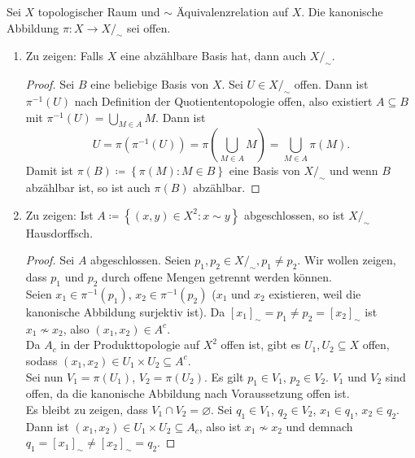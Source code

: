 \begin{problem}[4]
  Sei \( X \) topologischer Raum und \( \sim \) Äquivalenzrelation auf \( X \). Die kanonische Abbildung \( \pi : X \to X/_\sim \) sei offen.
  \begin{enumerate}
    \item Zu zeigen: Falls \( X \) eine abzählbare Basis hat, dann auch \( X/_\sim \).
    \begin{proof}
      Sei \( B \) eine beliebige Basis von \( X \). Sei \( U \in X/_\sim \) offen. Dann ist \( \pi^{-1}(U) \) nach Definition der Quotiententopologie offen, also existiert \( A \subseteq B \) mit \( \pi^{-1}(U) = \bigcup_{M \in A}M \). Dann ist
      \begin{equation*}
        U = \pi(\pi^{-1}(U)) = \pi\left(\bigcup_{M \in A} M \right) = \bigcup_{M \in A} \pi(M)\text{.}
      \end{equation*}
      Damit ist \( \pi(B) \coloneqq \left \{ \pi(M): M \in B \right \} \) eine Basis von \( X/_\sim \) und wenn \( B \) abzählbar ist, so ist auch \( \pi(B) \) abzählbar.
    \end{proof}
    
    \item Zu zeigen: Ist \( A \coloneqq \left \{ (x,y) \in X^2 : x \sim y \right \} \) abgeschlossen, so ist \( X/_\sim \) Hausdorffsch.
    \begin{proof}
      Sei \( A \) abgeschlossen. Seien \( p_1, p_2 \in X/_\sim, p_1 \neq p_2 \). Wir wollen zeigen, dass \( p_1 \) und \( p_2 \) durch offene Mengen getrennt werden können. \\
      Seien \( x_1 \in \pi^{-1}(p_1) \), \( x_2 \in \pi^{-1}(p_2) \) (\( x_1 \) und \( x_2 \) existieren, weil die kanonische Abbildung surjektiv ist). Da \( {[x_1]}_\sim = p_1 \neq p_2 = {[x_2]}_\sim \) ist \( x_1 \not \sim x_2 \), also \( (x_1, x_2) \in A^c \). \\
      Da \( A_c \) in der Produkttopologie auf \( X^2 \) offen ist, gibt es \( U_1, U_2 \subseteq X \) offen, sodass \( (x_1, x_2) \in U_1 \times U_2 \subseteq A^c \). \\
      Sei nun \( V_1 = \pi(U_1) \), \( V_2 = \pi(U_2) \). Es gilt \( p_1 \in V_1 \), \( p_2 \in V_2 \). \( V_1 \) und \( V_2 \) sind offen, da die kanonische Abbildung nach Voraussetzung offen ist. \\
      Es bleibt zu zeigen, dass \( V_1 \cap V_2 = \varnothing \). Sei \( q_1 \in V_1 \), \( q_2 \in V_2 \), \( x_1 \in q_1 \), \( x_2 \in q_2 \). Dann ist \( (x_1, x_2) \in U_1 \times U_2 \subseteq A_c \), also ist \( x_1 \not \sim x_2 \) und demnach \( q_1 = {[x_1]}_\sim \neq {[x_2]}_\sim = q_2 \).
    \end{proof}
  \end{enumerate}
\end{problem}



